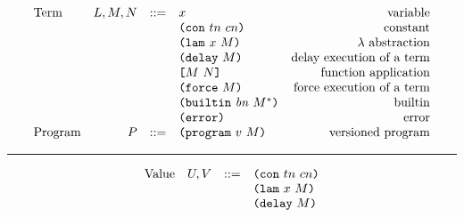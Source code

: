 \documentclass[../plutus-core-specification.tex]{subfiles}
\begin{document}
\begin{minipage}{\linewidth}
    \centering
    \[\begin{array}{lrclr}
    \textrm{Term}       & L,M,N  & ::= & x                      & \textrm{variable}\\
                        &        &     & \texttt{(} \texttt{con} ~ tn ~ cn \texttt{)}               & \textrm{constant}\\
                        &        &     & \texttt{(} \texttt{lam} ~ x ~ M  \texttt{)}            & \textrm{$\lambda$ abstraction}\\
                        &        &     & \texttt{(} \texttt{delay} ~ M \texttt{)}              & \textrm{delay execution of a term}\\
                        &        &     & \texttt{[} M ~ N \texttt{]}            & \textrm{function application}\\
                        &        &     & \texttt{(} \texttt{force} ~ M \texttt{)}              & \textrm{force execution of a term}\\
                        &        &     & \texttt{(} \texttt{builtin} ~ \mathit{bn} ~ M^* \texttt{)}     & \textrm{builtin}\\
                        &        &     & \texttt{(} \texttt{error} \texttt{)}                & \textrm{error}\\
        \textrm{Program}& P      & ::= & \texttt{(} \texttt{program} ~ v ~ M \texttt{)}         & \textrm{versioned program}
    \end{array}\]
    \label{fig:untyped-grammar}
\end{minipage}

\medskip\hrule\medskip

\begin{minipage}{\linewidth}
    \centering
    \[\begin{array}{lrcl}
        \textrm{Value}  & U, V   & ::= & \texttt{(} \texttt{con} ~ tn ~ cn \texttt{)}    \\
                        &        &     & \texttt{(} \texttt{lam} ~ x ~ M  \texttt{)} \\
                        &        &     & \texttt{(} \texttt{delay} ~ M \texttt{)}   
    \end{array}\]
    \label{fig:untyped-values}
\end{minipage}
\end{document}
